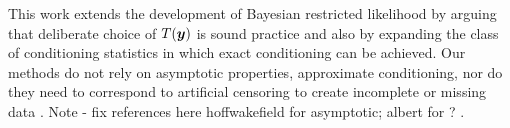 \documentclass[11pt]{article}
\newcommand{\by}{\mbox{\boldmath $y$}}
\newcommand{\green}[1]{{\color{green}#1}}
\begin{document}

This work extends the development of Bayesian restricted likelihood by arguing that deliberate choice of $T(\by)$ is sound practice and also by expanding the class of conditioning statistics in which exact conditioning can be achieved. Our methods do not rely on asymptotic properties, approximate conditioning, nor do they need to correspond to artificial censoring to create incomplete or missing data \citep[e.g.,][]{albert1988, hoffwakefield2013}.  \green{Note - fix references here hoffwakefield for asymptotic; albert for ? .}  
\end{document}
